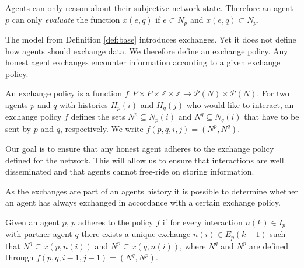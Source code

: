 Agents can only reason about their subjective network state. Therefore an agent $p$ can only \textit{evaluate}
the function $x(e, q)$ if $e \subset N_p$ and $x(e,q) \subset N_p$.

The model from Definition \ref{def:base} introduces exchanges. Yet it does not define
how agents should exchange data. We therefore define an exchange policy. Any honest agent 
exchanges encounter information according to a given exchange policy.

\begin{defn}[Exchange policy]
    An exchange policy is a function $f: P \times P \times \mathbb{Z} \times \mathbb{Z} \rightarrow \mathcal{P}(N) \times \mathcal{P}(N)$.
    For two agents $p$ and $q$ with histories $H_p(i)$ and $H_q(j)$ who would like to interact, 
    an exchange policy $f$ defines the sets $N^p \subseteq N_p(i)$ and $N^q \subseteq N_q(i)$ that 
    have to be sent by $p$ and $q$, respectively. We write $f(p,q,i,j) = (N^p, N^q)$.
\end{defn}

Our goal is to ensure that any honest agent adheres to the exchange policy defined for the network.
This will allow us to ensure that interactions are well disseminated and that agents cannot free-ride
on storing information.



As the exchanges are part of an agents history it is possible to determine whether an agent has always
exchanged in accordance with a certain exchange policy. 

\begin{defn}
    \label{def:adherence}
    Given an agent $p$, $p$ adheres to the policy $f$ if for every interaction $n(k) \in I_p$ with
    partner agent $q$ there exists a unique exchange $n(i) \in E_p(k-1)$ such that 
    $N^q \subseteq x(p, n(i))$ and $N^p \subseteq x(q, n(i))$, where $N^q$ and $N^p$ are defined 
    through $f(p,q,i-1,j-1)=(N^q, N^p)$.
\end{defn}



